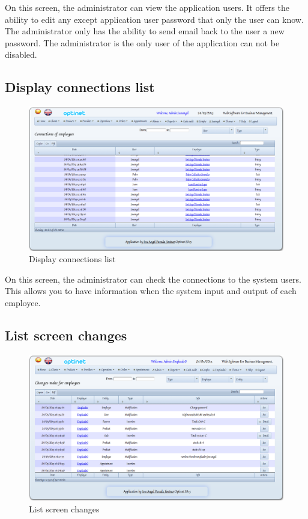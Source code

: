\documentclass[a4paper,11pt]{book}
\begin{document}
On this screen, the administrator can view the application users. It offers the ability to edit any except application user password that only the user can know. The administrator only has the ability to send email back to the user a new password. The administrator is the only user of the application can not be disabled.

\newpage
\subsection {Display connections list}

\begin{figure}[!htb]
  \centering
    \includegraphics[scale=0.35]{icapconexiones.png}
  \caption{Display connections list}
  \label{a}
\end{figure}

On this screen, the administrator can check the connections to the system users. This allows you to have information when the system input and output of each employee.

\newpage
\subsection {List screen changes}

\begin{figure}[!htb]
  \centering
    \includegraphics[scale=0.35]{icapcambios.png}
  \caption{List screen changes}
  \label{a}
\end{figure}
\end{document}
